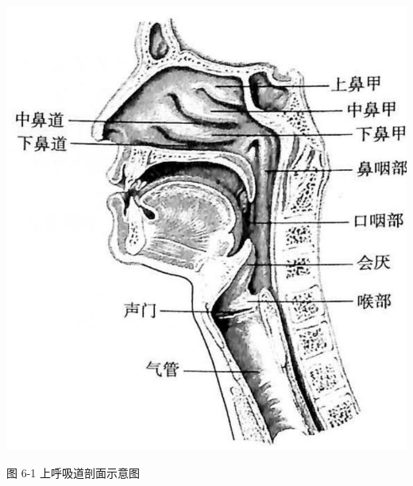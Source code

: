 \documentclass[10pt]{article}
\begin{document}
\begin{center}
\includegraphics[max width=\textwidth]{2024_07_09_002a177993bd97d1d6d7g-083}
\end{center}

图 6-1 上呼吸道剖面示意图
\end{document}
